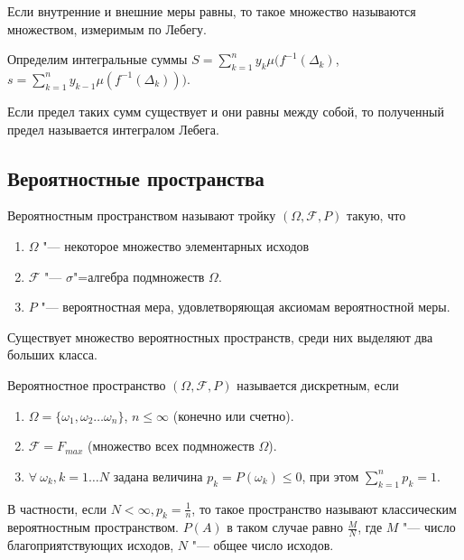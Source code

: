 Если внутренние и внешние меры равны, то такое множество называются множеством,
измеримым по Лебегу.

\begin{definition}
    Определим интегральные суммы $S = \sum\limits_{k = 1}^n y_k\mu(f^{-1}(\Delta_k)$, 
    $s = \sum\limits_{k = 1}^n y_{k - 1}\mu(f^{-1}(\Delta_k)))$.
    
    Если предел таких сумм существует и они равны между собой, то полученный 
    предел называется интегралом Лебега.
\end{definition}

\subsection{Вероятностные пространства}
\begin{definition}
    Вероятностным пространством называют тройку $(\Omega, \mathcal{F}, P)$ такую,
    что
    \begin{enumerate}
        \item $\Omega$ "--- некоторое множество элементарных исходов
        \item $\mathcal{F}$ "--- $\sigma$"=алгебра подмножеств $\Omega$.
        \item $P$ "--- вероятностная мера, удовлетворяющая аксиомам вероятностной меры.
        \end{enumerate}
\end{definition}
Существует множество вероятностных пространств, среди них выделяют два больших класса.
\begin{definition}
    Вероятностное пространство $(\Omega, \mathcal{F}, P)$ называется дискретным, если
    \begin{enumerate}
        \item $\Omega = \{\omega_1, \omega_2 \dots \omega_n\}$, $n \leq \infty$ (конечно или счетно).
        \item $\mathcal{F} = F_{max}$ (множество всех подмножеств $\Omega$).
        \item $\forall ~ \omega_k, k = 1 \dots N$ задана величина $p_k = P(\omega_k) \leq 0$, при этом
        $\sum\limits_{k = 1}^n p_k = 1$.
    \end{enumerate}
\end{definition}

\begin{definition}
В частности, если $N < \infty, p_k = \frac{1}{n}$, то такое
пространство называют классическим вероятностным пространством.
$P(A)$ в таком случае равно $\frac{M}{N}$, где $M$ "--- число благоприятствующих исходов, $N$ "--- общее число исходов.
\end{definition}

